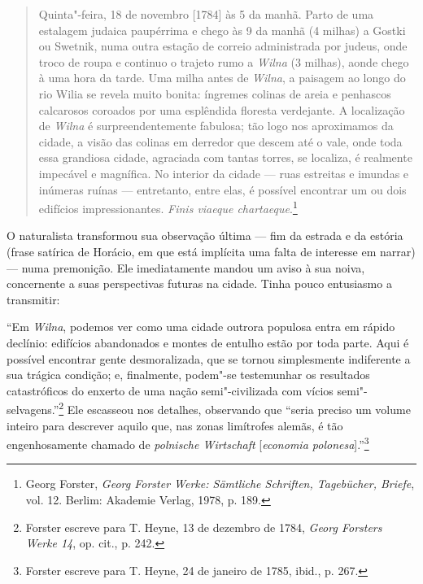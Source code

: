 \begin{quote}
Quinta"-feira, 18 de novembro {[}1784{]} às 5 da manhã. Parto de uma
estalagem judaica paupérrima e chego às 9 da manhã (4 milhas) a Gostki
ou Swetnik, numa outra estação de correio administrada por judeus, onde
troco de roupa e continuo o trajeto rumo a \textit{Wilna} (3 milhas), aonde chego
à uma hora da tarde. Uma milha antes de \textit{Wilna}, a paisagem ao longo do
rio Wilia se revela muito bonita: íngremes colinas de areia e penhascos
calcarosos coroados por uma esplêndida floresta verdejante. A
localização de \textit{Wilna} é surpreendentemente fabulosa; tão logo nos
aproximamos da cidade, a visão das colinas em derredor que descem até o
vale, onde toda essa grandiosa cidade, agraciada com tantas torres, se
localiza, é realmente impecável e magnífica. No interior da cidade ---
ruas estreitas e imundas e inúmeras ruínas --- entretanto, entre elas, é
possível encontrar um ou dois edifícios impressionantes. \textit{Finis
viaeque chartaeque}.\footnote{Georg Forster, \textit{Georg Forster Werke: Sämtliche Schriften, Tagebücher, Briefe}, vol. 12. Berlim: Akademie Verlag, 1978, p. 189.} 
\end{quote}

O naturalista transformou sua observação última --- fim da estrada e da
estória (frase satírica de Horácio, em que está implícita uma falta de
interesse em narrar) --- numa premonição. Ele imediatamente mandou um
aviso à sua noiva, concernente a suas perspectivas futuras na cidade.
Tinha pouco entusiasmo a transmitir:

%

``Em \textit{Wilna}, podemos ver como uma cidade outrora populosa entra em rápido
declínio: edifícios abandonados e montes de entulho estão por toda
parte. Aqui é possível encontrar gente desmoralizada, que se tornou
simplesmente indiferente a sua trágica condição; e, finalmente, podem"-se
testemunhar os resultados catastróficos do enxerto de uma nação
semi"-civilizada com vícios semi"-selvagens.''\footnote{Forster escreve para T. Heyne, 13 de dezembro de 1784, \textit{Georg Forsters Werke 14}, op. cit., p. 242.} Ele escasseou nos detalhes, observando que ``seria preciso um volume inteiro para descrever aquilo que, nas zonas
limítrofes alemãs, é tão engenhosamente chamado de \textit{polnische Wirtschaft} {[}\textit{economia polonesa}{]}.''\footnote{Forster escreve para T. Heyne, 24 de janeiro de 1785, ibid., p. 267.}

